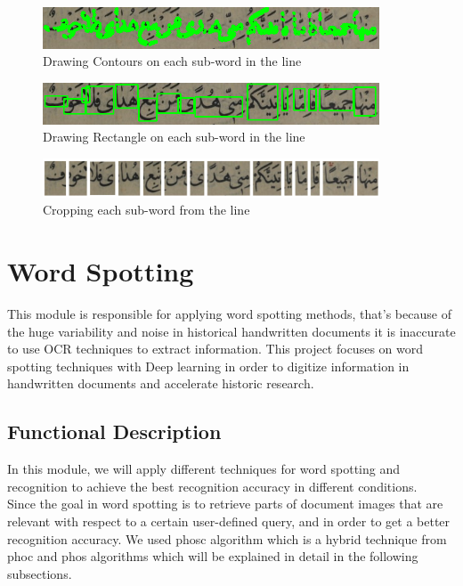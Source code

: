 \begin{figure}[!htb]
    \centering
    \includegraphics[width=10cm]{images/con2.png}
    \caption{Drawing Contours on each sub-word in the line}
    \label{fig:con2}
\end{figure} 

\begin{figure}[!htb]
    \centering
    \includegraphics[width=10cm]{images/con4.png}
    \caption{Drawing Rectangle on each sub-word in the line}
    \label{fig:con4}
\end{figure} 

\begin{figure}[!htb]
    \centering
    \includegraphics[width=10cm]{images/crops.png}
    \caption{Cropping each sub-word from the line}
    \label{fig:crops}
\end{figure} 

\clearpage

\section{Word Spotting}
This module is responsible for applying word spotting methods, that's because of the huge variability and noise in historical handwritten documents it is inaccurate to use OCR techniques to extract information. This project focuses on word spotting techniques with Deep learning in order to digitize information in handwritten documents and accelerate historic research.

\subsection{Functional Description}
In this module, we will apply different techniques for word spotting and recognition to achieve the best recognition accuracy in different conditions. \\

Since the goal in word spotting is to retrieve parts of document images that are relevant with respect to a certain user-defined query, and in order to get a better recognition accuracy. We used \acrshort{phosc} algorithm which is a hybrid technique from \acrshort{phoc} and \acrshort{phos} algorithms which will be explained in detail in the following subsections. 

